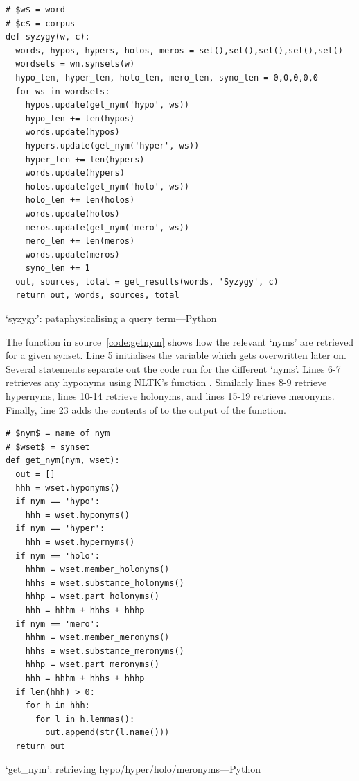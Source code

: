 \begin{listing}[!htbp] %
  \begin{verbatim}
# $w$ = word
# $c$ = corpus
def syzygy(w, c):
  words, hypos, hypers, holos, meros = set(),set(),set(),set(),set()
  wordsets = wn.synsets(w)
  hypo_len, hyper_len, holo_len, mero_len, syno_len = 0,0,0,0,0
  for ws in wordsets:
    hypos.update(get_nym('hypo', ws))
    hypo_len += len(hypos)
    words.update(hypos)
    hypers.update(get_nym('hyper', ws))
    hyper_len += len(hypers)
    words.update(hypers)
    holos.update(get_nym('holo', ws))
    holo_len += len(holos)
    words.update(holos)
    meros.update(get_nym('mero', ws))
    mero_len += len(meros)
    words.update(meros)
    syno_len += 1
  out, sources, total = get_results(words, 'Syzygy', c)
  return out, words, sources, total
  \end{verbatim}
\caption[`syzygy' function---Python]{`syzygy': pataphysicalising a query term---Python}
\label{code:syzygy}
\end{listing}

The  function in source~\ref{code:getnym} shows how the relevant `nyms' are retrieved for a given synset. Line 5 initialises the variable  which gets overwritten later on. Several  statements separate out the code run for the different `nyms'. Lines 6-7 retrieves any hyponyms using \ac{NLTK}'s  function . Similarly lines 8-9 retrieve hypernyms, lines 10-14 retrieve holonyms, and lines 15-19 retrieve meronyms. Finally, line 23 adds the contents of  to the output of the function.

\begin{listing}[!htbp] %
  \begin{verbatim}
# $nym$ = name of nym
# $wset$ = synset
def get_nym(nym, wset):
  out = []
  hhh = wset.hyponyms()
  if nym == 'hypo':
    hhh = wset.hyponyms()
  if nym == 'hyper':
    hhh = wset.hypernyms()
  if nym == 'holo':
    hhhm = wset.member_holonyms()
    hhhs = wset.substance_holonyms()
    hhhp = wset.part_holonyms()
    hhh = hhhm + hhhs + hhhp
  if nym == 'mero':
    hhhm = wset.member_meronyms()
    hhhs = wset.substance_meronyms()
    hhhp = wset.part_meronyms()
    hhh = hhhm + hhhs + hhhp
  if len(hhh) > 0:
    for h in hhh:
      for l in h.lemmas():
        out.append(str(l.name()))
  return out
  \end{verbatim}
\caption[`get\_nym' function---Python]{`get\_nym': retrieving hypo/hyper/holo/meronyms---Python}
\label{code:getnym}
\end{listing}

